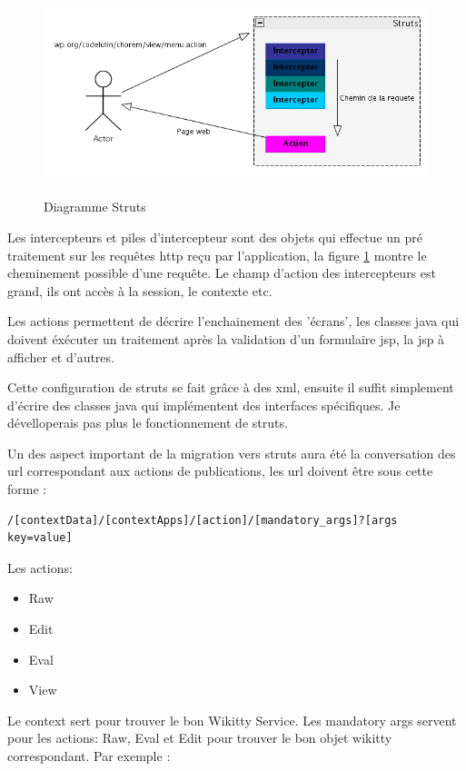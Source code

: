 \begin{figure}[!ht]
\centering
\includegraphics[height=6cm,width=17cm]{image/strutsexplain.png}
  		\caption{Diagramme Struts}
  		\label{diagstruts}
\end{figure}

Les intercepteurs et piles d'intercepteur sont des objets qui effectue un pré
traitement sur les requêtes http reçu par l'application, la figure \ref{diagstruts}
montre le cheminement possible d'une requête. Le champ d'action des intercepteurs
est grand, ils ont accès à la session, le contexte etc.

Les actions permettent de décrire l'enchainement des 'écrans', les classes java
qui doivent éxécuter un traitement après la validation d'un formulaire jsp, la
jsp à afficher et d'autres.

Cette configuration de struts se fait grâce à des xml, ensuite il suffit
simplement d'écrire des classes java qui implémentent des interfaces
spécifiques. Je dévelloperais pas plus le fonctionnement de struts.

Un des aspect important de la migration vers struts aura été la conversation des
url correspondant aux actions de publications, les url doivent être sous cette
forme : 
\begin{verbatim}
/[contextData]/[contextApps]/[action]/[mandatory_args]?[args key=value]
\end{verbatim}

Les actions: 
\begin{itemize}
\item Raw
\item Edit
\item Eval
\item View
\end{itemize}

Le context sert pour trouver le bon Wikitty Service. Les mandatory args servent
pour les actions: Raw, Eval et Edit pour trouver le bon objet wikitty
correspondant. Par exemple :

